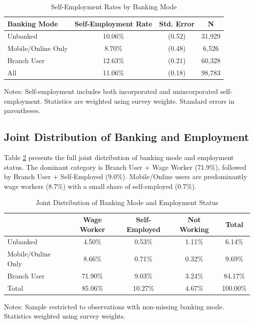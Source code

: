 \documentclass[12pt]{article}
\begin{document}
\begin{table}[H]
\centering
\caption{Self-Employment Rates by Banking Mode}
\label{tab:se_by_banking}
\begin{threeparttable}
\begin{tabular}{lccc}
\toprule
Banking Mode & Self-Employment Rate & Std. Error & N \\
\midrule
Unbanked & 10.06\% & (0.52) & 31,929 \\
Mobile/Online Only & 8.70\% & (0.48) & 6,526 \\
Branch User & 12.63\% & (0.21) & 60,328 \\
\midrule
All & 11.06\% & (0.18) & 98,783 \\
\bottomrule
\end{tabular}
\begin{tablenotes}
\small
\item Notes: Self-employment includes both incorporated and unincorporated self-employment. Statistics are weighted using survey weights. Standard errors in parentheses.
\end{tablenotes}
\end{threeparttable}
\end{table}

\subsection{Joint Distribution of Banking and Employment}

Table \ref{tab:joint_dist} presents the full joint distribution of banking mode and employment status. The dominant category is Branch User + Wage Worker (71.9\%), followed by Branch User + Self-Employed (9.0\%). Mobile/Online users are predominantly wage workers (8.7\%) with a small share of self-employed (0.7\%).

\begin{table}[H]
\centering
\caption{Joint Distribution of Banking Mode and Employment Status}
\label{tab:joint_dist}
\begin{threeparttable}
\begin{tabular}{lcccc}
\toprule
& Wage Worker & Self-Employed & Not Working & Total \\
\midrule
Unbanked & 4.50\% & 0.53\% & 1.11\% & 6.14\% \\
Mobile/Online Only & 8.66\% & 0.71\% & 0.32\% & 9.69\% \\
Branch User & 71.90\% & 9.03\% & 3.24\% & 84.17\% \\
\midrule
Total & 85.06\% & 10.27\% & 4.67\% & 100.00\% \\
\bottomrule
\end{tabular}
\begin{tablenotes}
\small
\item Notes: Sample restricted to observations with non-missing banking mode. Statistics weighted using survey weights.
\end{tablenotes}
\end{threeparttable}
\end{table}
\end{document}

